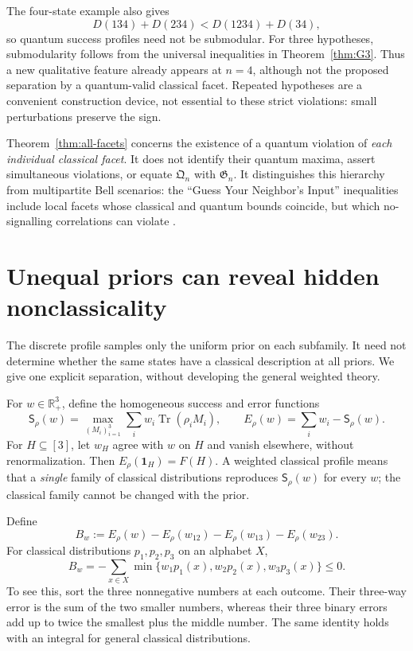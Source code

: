 \documentclass[a4paper,11pt,onecolumn,unpublished]{quantumarticle}
\theoremstyle{definition}
\newcommand{\Tr}{\operatorname{Tr}}
\newcommand{\R}{\mathbb R}
\newcommand{\1}{\mathbf 1}
\newcommand{\Qreg}{\mathfrak Q}
\newcommand{\Greg}{\mathfrak G}
\newcommand{\Sopt}{\mathsf S}
\begin{document}
The four-state example also gives
\begin{equation}\label{eq:submodularity-failure}
 D(134)+D(234)<D(1234)+D(34),
\end{equation}
so quantum success profiles need not be submodular. For three hypotheses,
submodularity follows from the universal inequalities in
Theorem~\ref{thm:G3}. Thus a new qualitative feature already appears at
$n=4$, although not the proposed separation by a quantum-valid classical
facet. Repeated hypotheses are a convenient construction device, not essential
to these strict violations: small perturbations preserve the sign.

Theorem~\ref{thm:all-facets} concerns the existence of a quantum violation of
\emph{each individual classical facet}. It does not identify their quantum
maxima, assert simultaneous violations, or equate $\Qreg_n$ with $\Greg_n$.
It distinguishes this hierarchy from multipartite Bell scenarios: the
``Guess Your Neighbor's Input'' inequalities include local facets whose
classical and quantum bounds coincide, but which no-signalling correlations
can violate \cite{AlmeidaEtAl2010}.

\section{Unequal priors can reveal hidden nonclassicality}\label{sec:weighted}

The discrete profile samples only the uniform prior on each subfamily. It need
not determine whether the same states have a classical description at all
priors. We give one explicit separation, without developing the general
weighted theory.

For $w\in\R_+^3$, define the homogeneous success and error functions
\begin{equation}\label{eq:weighted-def}
 \Sopt_\rho(w)=\max_{(M_i)_{i=1}^3}\sum_iw_i\Tr(\rho_iM_i),
 \qquad E_\rho(w)=\sum_iw_i-\Sopt_\rho(w).
\end{equation}
For $H\subseteq[3]$, let $w_H$ agree with $w$ on $H$ and vanish elsewhere,
without renormalization. Then $E_\rho(\1_H)=F(H)$. A weighted classical
profile means that a \emph{single} family of classical distributions reproduces
$\Sopt_\rho(w)$ for every $w$; the classical family cannot be changed with the
prior.

Define
\begin{equation}\label{eq:weighted-beta}
 B_w:=E_\rho(w)-E_\rho(w_{12})-E_\rho(w_{13})-E_\rho(w_{23}).
\end{equation}
For classical distributions $p_1,p_2,p_3$ on an alphabet $X$,
\begin{equation}\label{eq:weighted-classical}
 B_w=-\sum_{x\in X}\min\{w_1p_1(x),w_2p_2(x),w_3p_3(x)\}\le0.
\end{equation}
To see this, sort the three nonnegative numbers at each outcome. Their
three-way error is the sum of the two smaller numbers, whereas their three
binary errors add up to twice the smallest plus the middle number.
The same identity holds with an integral for general classical distributions.
\end{document}
